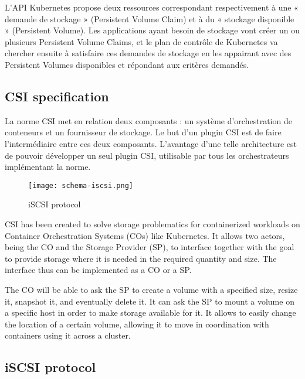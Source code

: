 \color{darkgreen}
L'API Kubernetes propose deux ressources correspondant respectivement à une « demande de stockage » (Persistent Volume Claim) et à du « stockage disponible » (Persistent Volume). Les applications ayant besoin de stockage vont créer un ou plusieurs Persistent Volume Claims, et le plan de contrôle de Kubernetes va chercher ensuite à satisfaire ces demandes de stockage en les appairant avec des Persistent Volumes disponibles et répondant aux critères demandés.
\color{black}

\subsection{CSI specification}

\color{darkgreen}
La norme CSI met en relation deux composants : un système d'orchestration de conteneurs et un fournisseur de stockage. Le but d'un plugin CSI est de faire l'intermédiaire entre ces deux composants. L'avantage d'une telle architecture est de pouvoir développer un seul plugin CSI, utilisable par tous les orchestrateurs implémentant la norme.

\begin{figure}[h]
    \centering
    \texttt{[image: schema-iscsi.png]}
    \caption{iSCSI protocol}
    \label{fig:icsci}
\end{figure}

CSI has been created to solve storage problematics for containerized workloads on Container Orchestration Systems (COs) like Kubernetes. It allows two actors, being the CO and the Storage Provider (SP), to interface together with the goal to provide storage where it is needed in the required quantity and size. The interface thus can be implemented as a CO or a SP.

The CO will be able to ask the SP to create a volume with a specified size, resize it, snapshot it, and eventually delete it. It can ask the SP to mount a volume on a specific host in order to make storage available for it. It allows to easily change the location of a certain volume, allowing it to move in coordination with containers using it across a cluster.
\color{black}

\subsection{iSCSI protocol}

